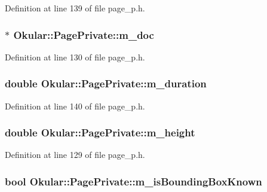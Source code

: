 Definition at line 139 of file page\+\_\+p.\+h.

\hypertarget{classOkular_1_1PagePrivate_ab08c9b47d5e631b19dd2d5c85360d351}{
\subsubsection[{m\+\_\+doc}]{$\ast$ Okular\+::\+Page\+Private\+::m\+\_\+doc}}\label{classOkular_1_1PagePrivate_ab08c9b47d5e631b19dd2d5c85360d351}


Definition at line 130 of file page\+\_\+p.\+h.

\hypertarget{classOkular_1_1PagePrivate_a769dbcae7ef3ee39d0f3f39d0022c6e1}{
\subsubsection[{m\+\_\+duration}]{\setlength{\rightskip}{0pt plus 5cm}double Okular\+::\+Page\+Private\+::m\+\_\+duration}}\label{classOkular_1_1PagePrivate_a769dbcae7ef3ee39d0f3f39d0022c6e1}


Definition at line 140 of file page\+\_\+p.\+h.

\hypertarget{classOkular_1_1PagePrivate_a767bcd56f261640f129e9ab39b9b0ff6}{
\subsubsection[{m\+\_\+height}]{\setlength{\rightskip}{0pt plus 5cm}double Okular\+::\+Page\+Private\+::m\+\_\+height}}\label{classOkular_1_1PagePrivate_a767bcd56f261640f129e9ab39b9b0ff6}


Definition at line 129 of file page\+\_\+p.\+h.

\hypertarget{classOkular_1_1PagePrivate_a236fd24cf599e972f7c75867a49f5337}{
\subsubsection[{m\+\_\+is\+Bounding\+Box\+Known}]{\setlength{\rightskip}{0pt plus 5cm}bool Okular\+::\+Page\+Private\+::m\+\_\+is\+Bounding\+Box\+Known}}\label{classOkular_1_1PagePrivate_a236fd24cf599e972f7c75867a49f5337}


